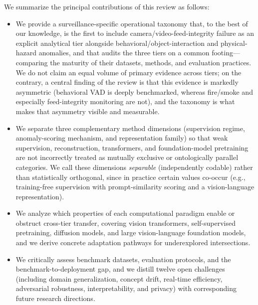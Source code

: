 \documentclass[10pt,a4paper]{article}
\begin{document}
We summarize the principal contributions of this review as follows:

\begin{itemize}
    \item We provide a surveillance-specific operational taxonomy that, to the best of our knowledge, is the first to include camera/video-feed-integrity failure as an explicit analytical tier alongside behavioral/object-interaction and physical-hazard anomalies, and that audits the three tiers on a common footing---comparing the maturity of their datasets, methods, and evaluation practices. We do not claim an equal volume of primary evidence across tiers; on the contrary, a central finding of the review is that this evidence is markedly asymmetric (behavioral VAD is deeply benchmarked, whereas fire/smoke and especially feed-integrity monitoring are not), and the taxonomy is what makes that asymmetry visible and measurable.

    \item We separate three complementary method dimensions (supervision regime, anomaly-scoring mechanism, and representation family) so that weak supervision, reconstruction, transformers, and foundation-model pretraining are not incorrectly treated as mutually exclusive or ontologically parallel categories. We call these dimensions \emph{separable} (independently codable) rather than statistically orthogonal, since in practice certain values co-occur (e.g., training-free supervision with prompt-similarity scoring and a vision-language representation).

    \item We analyze which properties of each computational paradigm enable or obstruct cross-tier transfer, covering vision transformers, self-supervised pretraining, diffusion models, and large vision-language foundation models, and we derive concrete adaptation pathways for underexplored intersections.

    \item We critically assess benchmark datasets, evaluation protocols, and the benchmark-to-deployment gap, and we distill twelve open challenges (including domain generalization, concept drift, real-time efficiency, adversarial robustness, interpretability, and privacy) with corresponding future research directions.
\end{itemize}
\end{document}
